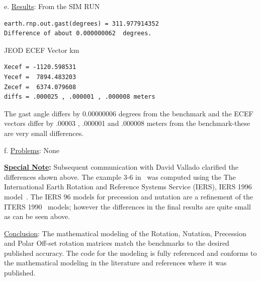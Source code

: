 e. \underline{Results}:\newline
From the SIM RUN
\begin{verbatim}
earth.rnp.out.gast(degrees) = 311.977914352
Difference of about 0.000000062  degrees.
\end{verbatim}

JEOD ECEF Vector {km}
\begin{verbatim}
Xecef = -1120.598531
Yecef =  7894.483203
Zecef =  6374.079608
diffs = .000025 , .000001 , .000008 meters
\end{verbatim}

The gast angle differs by 0.00000006 degrees from the benchmark and the 
ECEF vectors differ by .00003 , .000001 and .000008 meters from the benchmark-these are very small differences.\newline

f. \underline{ Problems}:\newline
None

{\bf\underline{Special Note}:} \newline
Subsequent communication with David Vallado clarified the differences shown 
above.  The example 3-6 in~\cite{VMcC} was computed using the 
The International Earth Rotation and Reference Systems Service (IERS), 
IERS 1996 model~\cite{IERS32}. The IERS 96 models for precession and 
nutation are a refinement of the ITERS 1990~\cite{IERS13} models; however 
the differences in the final results are quite small as can be seen above. 

\underline{Conclusion}:\newline
The mathematical modeling of the Rotation, Nutation, Precession and Polar 
Off-set rotation matrices match the benchmarks to the desired published 
accuracy.  The code for the modeling is fully referenced and conforms to the 
mathematical modeling in the literature and references where it was published.

\newpage
\boilerplatetraceability

\newpage
\boilerplatemetrics

